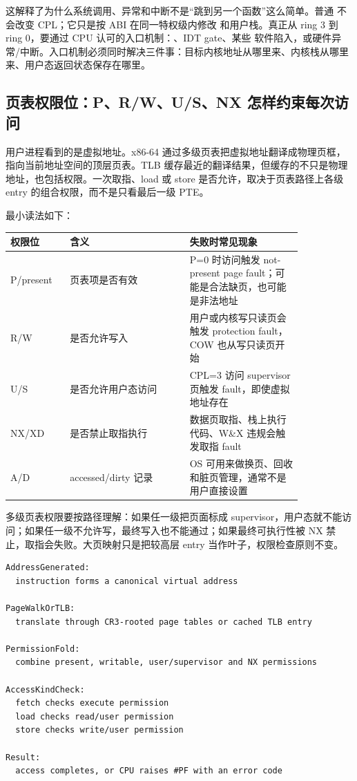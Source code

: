 这解释了为什么系统调用、异常和中断不是“跳到另一个函数”这么简单。普通  不会改变 CPL；它只是按 ABI 在同一特权级内修改  和用户栈。真正从 ring 3 到 ring 0，要通过 CPU 认可的入口机制：、IDT gate、某些  软件陷入，或硬件异常/中断。入口机制必须同时解决三件事：目标内核地址从哪里来、内核栈从哪里来、用户态返回状态保存在哪里。

\subsection{页表权限位：P、R/W、U/S、NX 怎样约束每次访问}

用户进程看到的是虚拟地址。x86-64 通过多级页表把虚拟地址翻译成物理页框， 指向当前地址空间的顶层页表。TLB 缓存最近的翻译结果，但缓存的不只是物理地址，也包括权限。一次取指、load 或 store 是否允许，取决于页表路径上各级 entry 的组合权限，而不是只看最后一级 PTE。

最小读法如下：

\begin{center}
\small
\begin{tabular}{p{0.16\linewidth}p{0.35\linewidth}p{0.33\linewidth}}
\toprule
权限位 & 含义 & 失败时常见现象 \\
\midrule
P/present & 页表项是否有效 & P=0 时访问触发 not-present page fault；可能是合法缺页，也可能是非法地址 \\
R/W & 是否允许写入 & 用户或内核写只读页会触发 protection fault，COW 也从写只读页开始 \\
U/S & 是否允许用户态访问 & CPL=3 访问 supervisor 页触发 fault，即使虚拟地址存在 \\
NX/XD & 是否禁止取指执行 & 数据页取指、栈上执行代码、W\&X 违规会触发取指 fault \\
A/D & accessed/dirty 记录 & OS 可用来做换页、回收和脏页管理，通常不是用户直接设置 \\
\bottomrule
\end{tabular}
\end{center}

多级页表权限要按路径理解：如果任一级把页面标成 supervisor，用户态就不能访问；如果任一级不允许写，最终写入也不能通过；如果最终可执行性被 NX 禁止，取指会失败。大页映射只是把较高层 entry 当作叶子，权限检查原则不变。

\begin{lstlisting}[numbers=none,caption={页表权限检查的更细状态机}]
AddressGenerated:
  instruction forms a canonical virtual address

PageWalkOrTLB:
  translate through CR3-rooted page tables or cached TLB entry

PermissionFold:
  combine present, writable, user/supervisor and NX permissions

AccessKindCheck:
  fetch checks execute permission
  load checks read/user permission
  store checks write/user permission

Result:
  access completes, or CPU raises #PF with an error code
\end{lstlisting}

